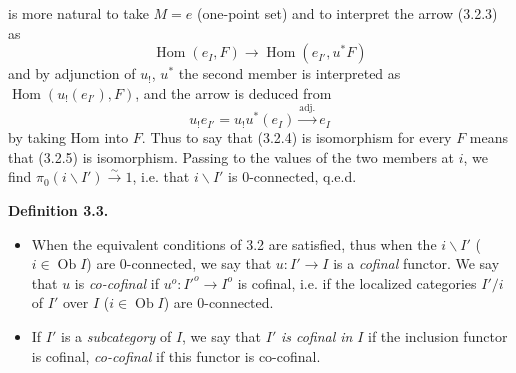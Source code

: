 \documentclass[11pt]{article}
\newcommand{\printedpage}[1]{\marginpar{\footnotesize p.~#1}}
\newcommand{\msp}[1]{\marginpar{\footnotesize [#1]}}
\newcommand{\Hom}{\operatorname{Hom}}
\newcommand{\Ob}{\operatorname{Ob}}
\newcommand{\bs}{\backslash}
\begin{document}
\printedpage{29}

\msp{page 45}
is more natural to take $M = e$ (one-point set) and to interpret the arrow (3.2.3) as
\[
\Hom(e_I, F) \longrightarrow \Hom(e_{I'}, u^*F)
\tag*{(3.2.4)}
\]
and by adjunction of $u_!$, $u^*$ the second member is interpreted as $\Hom(u_!(e_{I'}), F)$, and the arrow is deduced from
\[
u_!e_{I'} = u_!u^*(e_I) \xrightarrow{\text{adj.}} e_I
\tag*{(3.2.5)}
\]
by taking Hom into $F$. Thus to say that (3.2.4) is isomorphism for every $F$ means that (3.2.5) is isomorphism. Passing to the values of the two members at $i$, we find $\pi_0(i\bs I') \xrightarrow{\sim} 1$, i.e. that $i\bs I'$ is 0-connected, q.e.d.

\noindent\textbf{Definition 3.3.}
\begin{itemize}[label={}]
\item[a)] When the equivalent conditions of 3.2 are satisfied, thus when the $i\bs I'$ ($i \in \Ob I$) are 0-connected, we say that $u : I' \longrightarrow I$ is a \textit{cofinal} functor. We say that $u$ is \textit{co-cofinal} if $u^o : I'^o \longrightarrow I^o$ is cofinal, i.e. if the localized categories $I'/i$ of $I'$ over $I$ ($i \in \Ob I$) are 0-connected.
\item[b)] If $I'$ is a \textit{subcategory} of $I$, we say that $I'$ \textit{is cofinal in} $I$ if the inclusion functor is cofinal, \textit{co-cofinal} if this functor is co-cofinal.
\end{itemize}
\end{document}
